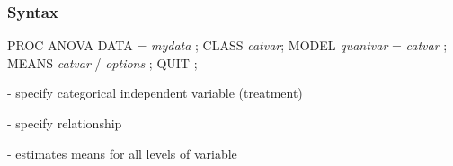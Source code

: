 %
%
%


\begin{frame}[fragile]
\frametitle{Syntax}
\footnotesize
\begin{code}{.0}
PROC ANOVA DATA = \emph{mydata} ;
    CLASS \emph{catvar};
    MODEL \emph{quantvar} = \emph{catvar} ;
    MEANS \emph{catvar}  /  \emph{options} ;
QUIT ;
\end{code}
\emp
\vskip10pt
\bi
\item {} - specify categorical independent variable (treatment)
\item {} - specify relationship
\item {} - estimates means for all levels of  variable
\ei
\end{frame}

